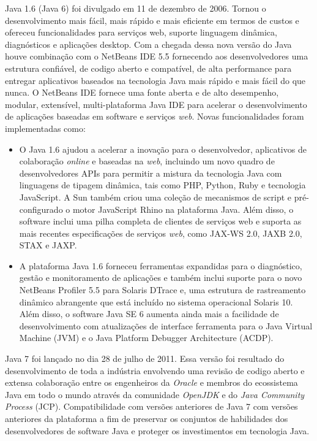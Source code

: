 Java 1.6 (Java 6) foi divulgado em 11 de dezembro de 2006. Tornou o desenvolvimento mais fácil, mais rápido e mais eficiente em termos de custos e ofereceu funcionalidades para serviços web, suporte linguagem dinâmica, diagnósticos e aplicações desktop. Com a chegada dessa nova versão do Java houve combinação com o NetBeans IDE 5.5 fornecendo aos desenvolvedores uma estrutura confiável, de codigo aberto e compatível, de alta performance para entregar aplicativos baseados na tecnologia Java mais rápido e mais fácil do que nunca. O NetBeans IDE fornece uma fonte aberta e de alto desempenho, modular, extensível, multi-plataforma Java IDE para acelerar o desenvolvimento de aplicações baseadas em software e serviços {\it web}.
Novas funcionalidades foram implementadas como:

\begin{itemize}
  \item O Java 1.6 ajudou a acelerar a inovação para o desenvolvedor, aplicativos de colaboração {\it online} e baseadas na {\it web}, incluindo um novo quadro de desenvolvedores APIs para permitir a mistura da tecnologia Java com linguagens de tipagem dinâmica, tais como PHP, Python, Ruby e tecnologia JavaScript. A Sun também criou uma coleção de mecanismos de script e pré-configurado o motor JavaScript Rhino na plataforma Java. Além disso, o software inclui uma pilha completa de clientes de serviços web e suporta as mais recentes especificações de serviços {\it web}, como JAX-WS 2.0, JAXB 2.0, STAX e JAXP.
  \item A plataforma Java 1.6 forneceu ferramentas expandidas para o diagnóstico, gestão e monitoramento de aplicações e também inclui suporte para o novo NetBeans Profiler 5.5 para Solaris DTrace e, uma estrutura de rastreamento dinâmico abrangente que está incluído no sistema operacional Solaris 10. Além disso, o software Java SE 6 aumenta ainda mais a facilidade de desenvolvimento com atualizações de interface ferramenta para o Java Virtual Machine (JVM) e o Java Platform Debugger Architecture (ACDP).
\end{itemize}

Java 7 \cite{JSE7_ReleaseNotes} foi lançado no dia 28 de julho de 2011. Essa versão foi resultado do desenvolvimento de toda a indústria envolvendo uma revisão de codigo aberto e extensa colaboração entre os engenheiros da {\it Oracle} e membros do ecossistema Java em todo o mundo através da comunidade {\it OpenJDK} e do {\it Java Community Process} (JCP). Compatibilidade com versões anteriores de Java 7 com versões anteriores da plataforma a fim de preservar os conjuntos de habilidades dos desenvolvedores de software Java e proteger os investimentos em tecnologia Java.

